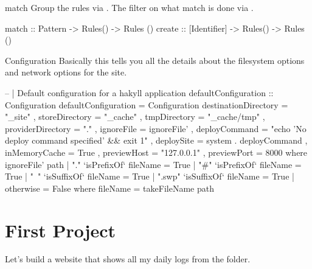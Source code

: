 \documentclass[openany, 12pt]{article}
\begin{document}
\begin{definition}{match}{}
	Group the rules via . The filter on what match is done via
	.
	\begin{haskell}{}
match  :: Pattern      -> Rules() -> Rules ()
create :: [Identifier] -> Rules() -> Rules ()
    \end{haskell}
\end{definition}

\begin{definition}{Configuration}{}
	Basically this tells you all the details about the filesystem options and
	network options for the site.

	\begin{haskell}{}
-- | Default configuration for a hakyll application
defaultConfiguration :: Configuration
defaultConfiguration = Configuration
    { destinationDirectory = "_site"
    , storeDirectory       = "_cache"
    , tmpDirectory         = "_cache/tmp"
    , providerDirectory    = "."
    , ignoreFile           = ignoreFile'
    , deployCommand        = "echo 'No deploy command specified' && exit 1"
    , deploySite           = system . deployCommand
    , inMemoryCache        = True
    , previewHost          = "127.0.0.1"
    , previewPort          = 8000
    }
  where
    ignoreFile' path
        | "."    `isPrefixOf` fileName = True
        | "#"    `isPrefixOf` fileName = True
        | "~"    `isSuffixOf` fileName = True
        | ".swp" `isSuffixOf` fileName = True
        | otherwise                    = False
      where
          fileName = takeFileName path
\end{haskell}
\end{definition}

\section{First Project}
Let's build a website that shows all my daily logs from the
 folder.

\printindex{}
\end{document}

